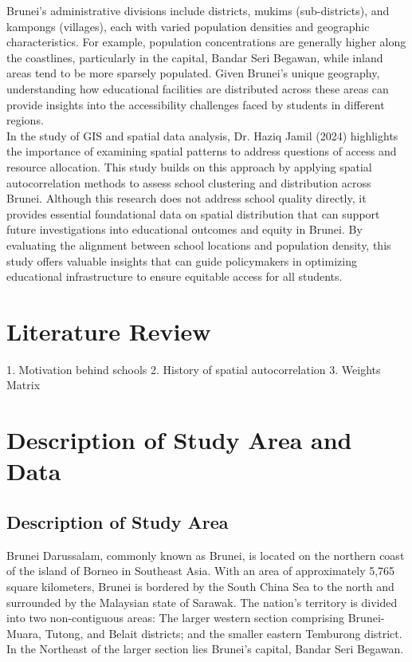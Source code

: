 \documentclass[12pt]{article}
\begin{document}
Brunei’s administrative divisions include districts, mukims (sub-districts), and kampongs (villages), each with varied population densities and geographic characteristics. For example, population concentrations are generally higher along the coastlines, particularly in the capital, Bandar Seri Begawan, while inland areas tend to be more sparsely populated. Given Brunei’s unique geography, understanding how educational facilities are distributed across these areas can provide insights into the accessibility challenges faced by students in different regions. \\

In the study of GIS and spatial data analysis, Dr. Haziq Jamil (2024) highlights the importance of examining spatial patterns to address questions of access and resource allocation. This study builds on this approach by applying spatial autocorrelation methods to assess school clustering and distribution across Brunei. Although this research does not address school quality directly, it provides essential foundational data on spatial distribution that can support future investigations into educational outcomes and equity in Brunei. By evaluating the alignment between school locations and population density, this study offers valuable insights that can guide policymakers in optimizing educational infrastructure to ensure equitable access for all students. \\

\section{Literature Review}
1. Motivation behind schools
2. History of spatial autocorrelation
3. Weights Matrix



\section{Description of Study Area and Data}
\subsection{Description of Study Area}
Brunei Darussalam, commonly known as Brunei, is located on the northern coast of the island of Borneo in Southeast Asia. With an area of approximately 5,765 square kilometers, Brunei is bordered by the South China Sea to the north and surrounded by the Malaysian state of Sarawak. The nation’s territory is divided into two non-contiguous areas:  The larger western section comprising Brunei-Muara, Tutong, and Belait districts; and the smaller eastern Temburong district. In the Northeast of the larger section lies Brunei's capital, Bandar Seri Begawan. \\
\end{document}

